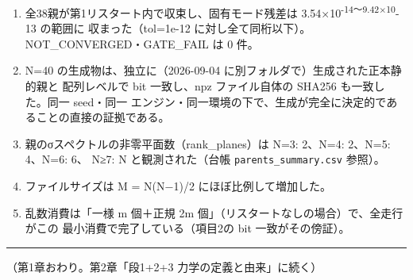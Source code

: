 \documentclass[
  a4paper,
]{ltjsarticle}
\providecommand{\tightlist}{%
  \setlength{\itemsep}{0pt}\setlength{\parskip}{0pt}}
\begin{document}
\begin{enumerate}
\def\labelenumi{\arabic{enumi}.}
\tightlist
\item
  全38親が第1リスタート内で収束し、固有モード残差は
  3.54×10\textsuperscript{-14〜9.42×10}-13 の範囲に 収まった（tol=1e-12
  に対し全て同桁以下）。NOT\_CONVERGED・GATE\_FAIL は 0 件。
\item
  N=40 の生成物は、独立に（2026-09-04
  に別フォルダで）生成された正本静的親と 配列レベルで bit 一致し、npz
  ファイル自体の SHA256 も一致した。同一 seed・同一
  エンジン・同一環境の下で、生成が完全に決定的であることの直接の証拠である。
\item
  親のσスペクトルの非零平面数（rank\_planes）は N=3: 2、N=4: 2、N=5:
  4、N=6: 6、 N≥7: N と観測された（台帳 \texttt{parents\_summary.csv}
  参照）。
\item
  ファイルサイズは M = N(N−1)/2 にほぼ比例して増加した。
\item
  乱数消費は「一様 m 個＋正規 2m
  個」（リスタートなしの場合）で、全走行がこの
  最小消費で完了している（項目2の bit 一致がその傍証）。
\end{enumerate}

\begin{center}\rule{0.5\linewidth}{0.5pt}\end{center}

（第1章おわり。第2章「段1+2+3 力学の定義と由来」に続く）
\end{document}
